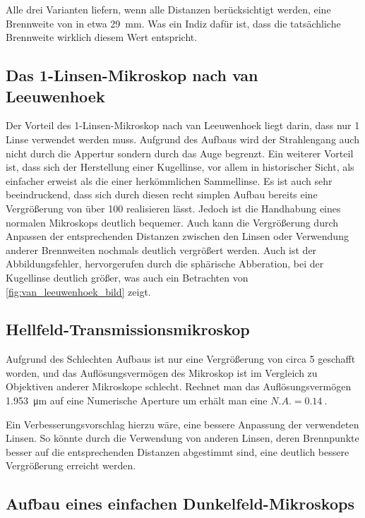 \documentclass[12pt,english,ngerman]{scrartcl}
\begin{document}
Alle drei Varianten liefern, wenn alle Distanzen berücksichtigt werden, eine
Brennweite von in etwa \SI{29}{\mm}. Was ein Indiz dafür ist, dass die
tatsächliche Brennweite wirklich diesem Wert entspricht.

\subsection{Das 1-Linsen-Mikroskop nach van Leeuwenhoek}


Der Vorteil des 1-Linsen-Mikroskop nach van Leeuwenhoek liegt darin, dass nur 1
Linse verwendet werden muss. Aufgrund des Aufbaus wird der Strahlengang auch
nicht durch die Appertur sondern durch das Auge begrenzt. Ein weiterer Vorteil
ist, dass sich der Herstellung einer Kugellinse, vor allem in historischer
Sicht, als einfacher erweist als die einer herkömmlichen Sammellinse. Es ist
auch sehr beeindruckend, dass sich durch diesen recht simplen Aufbau bereits
eine Vergrößerung von über 100 realisieren lässt. Jedoch ist die Handhabung
eines normalen Mikroskops deutlich bequemer. Auch kann die Vergrößerung durch
Anpassen der entsprechenden Distanzen zwischen den Linsen oder Verwendung
anderer Brennweiten nochmals deutlich vergrößert werden. Auch ist der
Abbildungsfehler, hervorgerufen durch die sphärische Abberation, bei der
Kugellinse deutlich größer, was auch ein Betrachten von
\autoref{fig:van_leeuwenhoek_bild} zeigt.

\subsection{Hellfeld-Transmissionsmikroskop}

Aufgrund des Schlechten Aufbaus ist nur eine Vergrößerung von circa \num{5}
geschafft worden, und das Auflösungsvermögen des Mikroskop ist im Vergleich zu
Objektiven anderer Mikroskope schlecht. Rechnet man das Auflösungsvermögen
\SI{1.953}{\um} auf eine Numerische Aperture um erhält man eine $N.A. =
	\SI{0.14}{}$.

Ein Verbesserungsvorschlag hierzu wäre, eine bessere Anpassung der verwendeten
Linsen. So könnte durch die Verwendung von anderen Linsen, deren Brennpunkte
besser auf die entsprechenden Distanzen abgestimmt sind, eine deutlich bessere
Vergrößerung erreicht werden.

\subsection{Aufbau eines einfachen Dunkelfeld-Mikroskops}
\end{document}
